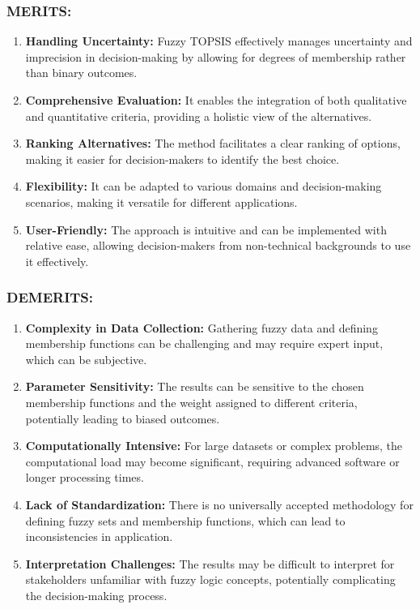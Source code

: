 \documentclass[12pt,a4paper]{article}
\begin{document}
\subsubsection*{MERITS:}
\begin{enumerate}
    \item \textbf{Handling Uncertainty:} Fuzzy TOPSIS effectively manages uncertainty and imprecision in decision-making by allowing for degrees of membership rather than binary outcomes.


    \item \textbf{Comprehensive Evaluation:} It enables the integration of both qualitative and quantitative criteria, providing a holistic view of the alternatives.


    \item \textbf{Ranking Alternatives:} The method facilitates a clear ranking of options, making it easier for decision-makers to identify the best choice.


    \item \textbf{Flexibility:} It can be adapted to various domains and decision-making scenarios, making it versatile for different applications.


    \item \textbf{User-Friendly:} The approach is intuitive and can be implemented with relative ease, allowing decision-makers from non-technical backgrounds to use it effectively.

\end{enumerate}

\subsubsection*{DEMERITS:}
\begin{enumerate}
    \item \textbf{Complexity in Data Collection:} Gathering fuzzy data and defining membership functions can be challenging and may require expert input, which can be subjective.


    \item \textbf{Parameter Sensitivity:} The results can be sensitive to the chosen membership functions and the weight assigned to different criteria, potentially leading to biased outcomes.


    \item \textbf{Computationally Intensive:} For large datasets or complex problems, the computational load may become significant, requiring advanced software or longer processing times.


    \item \textbf{Lack of Standardization:} There is no universally accepted methodology for defining fuzzy sets and membership functions, which can lead to inconsistencies in application.


    \item \textbf{Interpretation Challenges:} The results may be difficult to interpret for stakeholders unfamiliar with fuzzy logic concepts, potentially complicating the decision-making process.
\end{enumerate}
\end{document}
